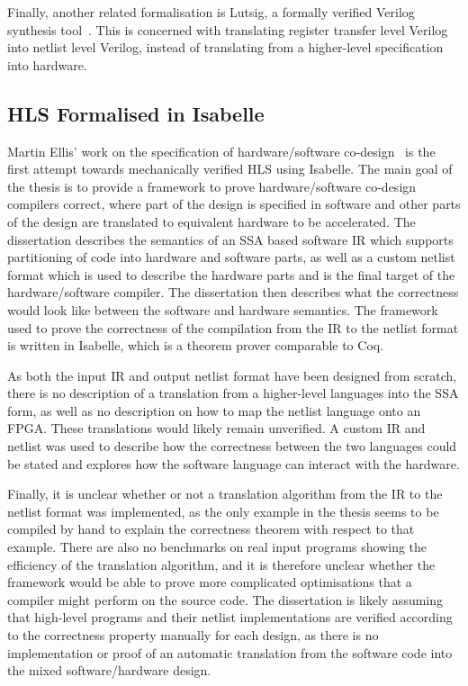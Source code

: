 Finally, another related formalisation is Lutsig, a formally verified Verilog
synthesis tool~\cite[]{lööw21_lutsig}.  This is concerned with translating
register transfer level Verilog into netlist level Verilog, instead of
translating from a higher-level specification into hardware.

\subsection{HLS Formalised in Isabelle}

Martin Ellis' work on the specification of hardware/software
co-design~\cite{ellis08_csicgfu} is the first attempt towards mechanically
verified \gls{HLS} using Isabelle.  The main goal of the thesis is to provide a
framework to prove hardware/software co-design compilers correct, where part of
the design is specified in software and other parts of the design are translated
to equivalent hardware to be accelerated.  The dissertation describes the
semantics of an \gls{SSA} based software \gls{IR} which supports partitioning of
code into hardware and software parts, as well as a custom netlist format which
is used to describe the hardware parts and is the final target of the
hardware/software compiler.  The dissertation then describes what the
correctness would look like between the software and hardware semantics. The
framework used to prove the correctness of the compilation from the IR to the
netlist format is written in Isabelle, which is a theorem prover comparable to
Coq.

As both the input IR and output netlist format have been designed from scratch,
there is no description of a translation from a higher-level languages into the
\gls{SSA} form, as well as no description on how to map the netlist language
onto an \gls{FPGA}.  These translations would likely remain unverified.  A
custom IR and netlist was used to describe how the correctness between the two
languages could be stated and explores how the software language can interact
with the hardware.

Finally, it is unclear whether or not a translation algorithm from the IR to the
netlist format was implemented, as the only example in the thesis seems to be
compiled by hand to explain the correctness theorem with respect to that
example.  There are also no benchmarks on real input programs showing the
efficiency of the translation algorithm, and it is therefore unclear whether the
framework would be able to prove more complicated optimisations that a compiler
might perform on the source code.  The dissertation is likely assuming that
high-level programs and their netlist implementations are verified according to
the correctness property manually for each design, as there is no implementation
or proof of an automatic translation from the software code into the mixed
software/hardware design.

